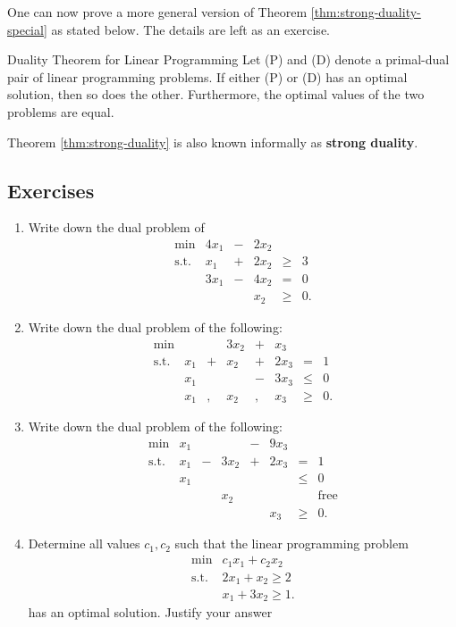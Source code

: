 One can now prove a more general version of Theorem
\ref{thm:strong-duality-special} as stated below. The details are left
as an exercise.

\begin{theorem}{Duality Theorem for Linear Programming}{}
\protect\hypertarget{thm:strong-duality}{}{\label{thm:strong-duality}
{} } Let (P) and
(D) denote a primal-dual pair of linear programming problems. If either
(P) or (D) has an optimal solution, then so does the other. Furthermore,
the optimal values of the two problems are equal.
\end{theorem}

Theorem \ref{thm:strong-duality} is also known informally as
\textbf{strong duality}.

\subsection*{Exercises}\label{exercises-6}

\begin{enumerate}
\def\labelenumi{\arabic{enumi}.}
\item
  Write down the dual problem of \[\begin{array}{rrcrcl}
  \min & 4x_1 & - & 2x_2 \\
  \text{s.t.} 
   & x_1 & + & 2x_2 & \geq & 3\\
   & 3x_1 & - & 4x_2 & = & 0 \\
   &  & & x_2 & \geq & 0.
  \end{array}\]
\item
  Write down the dual problem of the following: \[
  \begin{array}{rrcrcrcl}
  \min  &    &  &3x_2  & + & x_3 \\
  \mbox{s.t.}
   & x_1 & + & x_2 & + & 2x_3 & = & 1 \\
   & x_1 &   &     & - & 3x_3 & \leq & 0 \\
   & x_1 & , & x_2 & , & x_3 & \geq & 0.
  \end{array}
  \]
\item
  Write down the dual problem of the following: \[
  \begin{array}{rrcrcrcl}
  \min  & x_1 &  &  & - & 9x_3 \\
  \mbox{s.t.}
   & x_1 & - & 3x_2 &  + & 2x_3 & = & 1 \\
   & x_1 & &  & &  & \leq & 0 \\
   & &  & x_2 & &  &  & \mbox{free} \\
   & &  & &  & x_3 & \geq & 0.
  \end{array}\]
\item
  Determine all values \(c_1,c_2\) such that the linear programming
  problem \[\begin{array}{rl}
  \min & c_1 x_1 + c_2 x_2 \\
  \text{s.t.} & 2x_1 + x_2 \geq 2 \\
  & x_1 + 3x_2 \geq 1.
  \end{array}
  \] has an optimal solution. Justify your answer
\end{enumerate}

